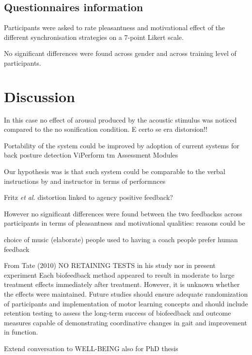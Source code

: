 \documentclass[10pt,letterpaper]{article}
\begin{document}
\subsection*{Questionnaires information}

Participants were asked to rate pleasantness and motivational effect of the different synchronisation strategies on a 7-point Likert scale. 

No significant differences were found across gender and across training level of participants. 

\section*{Discussion} \label{sec:discussion}

In this case no effect of arousal produced by the acoustic stimulus was noticed compared to the no sonification condition. E certo se era distorsion!!


Portability of the system could be improved by adoption of current systems for back posture detection ViPerform tm Assessment Modules


Our hypothesis was is that such system could be comparable to the verbal instructions by and instructor in terms of performnces 

Fritz \emph{et al.}  \cite{fritz2013musical}  distortion linked to agency positive feedback?


However no significant differences were found between the two feedbackss across participants in terms of pleasantness and motivational qualities: reasons could be

choice of music (elaborate)
people used to having a coach
people prefer human feedback

From Tate (2010) NO RETAINING TESTS in his study nor in present experiment
 Each biofeedback method appeared to result in moderate to large treatment effects immediately after treatment. However, it is unknown whether the effects were maintained. Future studies should ensure adequate randomization of participants and implementation of motor learning concepts and should include retention testing to assess the long-term success of biofeedback and outcome measures capable of demonstrating coordinative changes in gait and improvement in function.

Extend conversation to WELL-BEING also for PhD thesis



\end{document}

